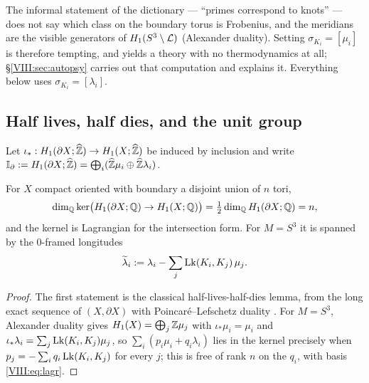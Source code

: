 \begin{remark}\label{VIII:rem:choice}
The informal statement of the dictionary --- ``primes correspond to knots'' --- does not say
which class on the boundary torus is Frobenius, and the meridians are the visible generators
of $H_1(S^3\setminus\mathcal{L})$ (Alexander duality). Setting $\sigma_{K_i}=[\mu_i]$ is therefore tempting, and yields a
theory with no thermodynamics at all; \S\ref{VIII:sec:autopsy} carries out that computation and
explains it. Everything below uses $\sigma_{K_i}=[\lambda_i]$.
\end{remark}

\subsection{Half lives, half dies, and the unit group}

Let $\iota_*:H_1(\partial X;\widehat{\mathbb{Z}})\to H_1(X;\widehat{\mathbb{Z}})$ be induced by inclusion and write
$\mathbb{I}_\partial:=H_1(\partial X;\widehat{\mathbb{Z}})=\bigoplus_i(\widehat{\mathbb{Z}}\mu_i\oplus\widehat{\mathbb{Z}}\lambda_i)$.

\begin{theorem}\label{VIII:thm:hlhd}
For $X$ compact oriented with boundary a disjoint union of $n$ tori,
\[
\dim_{\mathbb{Q}}\ker\bigl(H_1(\partial X;\mathbb{Q})\to H_1(X;\mathbb{Q})\bigr)=\tfrac12\dim_{\mathbb{Q}} H_1(\partial X;\mathbb{Q})=n,
\]
and the kernel is Lagrangian for the intersection form. For $M=S^3$ it is spanned by the
$0$-framed longitudes
\begin{equation}\label{VIII:eq:lagr}
\widetilde\lambda_i:=\lambda_i-\sum_j\operatorname{Lk}(K_i,K_j)\,\mu_j .
\end{equation}
\end{theorem}

\begin{proof}
The first statement is the classical half-lives-half-dies lemma, from the long exact sequence
of $(X,\partial X)$ with Poincaré--Lefschetz duality \cite[Ch.~4]{Thurston}. For $M=S^3$, Alexander duality gives
$H_1(X)=\bigoplus_j\mathbb{Z}\mu_j$ with $\iota_*\mu_i=\mu_i$ and
$\iota_*\lambda_i=\sum_j\operatorname{Lk}(K_i,K_j)\mu_j$, so $\sum_i(p_i\mu_i+q_i\lambda_i)$ lies in the
kernel precisely when $p_j=-\sum_iq_i\operatorname{Lk}(K_i,K_j)$ for every $j$; this is free of rank $n$ on
the $q_i$, with basis \eqref{VIII:eq:lagr}.
\end{proof}

